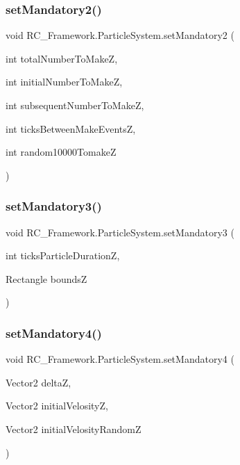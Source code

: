 \subsubsection{\texorpdfstring{set\+Mandatory2()}{setMandatory2()}}
{\footnotesize\ttfamily void R\+C\+\_\+\+Framework.\+Particle\+System.\+set\+Mandatory2 (\begin{DoxyParamCaption}\item[{int}]{total\+Number\+To\+MakeZ,  }\item[{int}]{initial\+Number\+To\+MakeZ,  }\item[{int}]{subsequent\+Number\+To\+MakeZ,  }\item[{int}]{ticks\+Between\+Make\+EventsZ,  }\item[{int}]{random10000\+TomakeZ }\end{DoxyParamCaption})}

\mbox{\label{class_r_c___framework_1_1_particle_system_a4a7d1047a8f891f66c5cc2f290520107}} 
\subsubsection{\texorpdfstring{set\+Mandatory3()}{setMandatory3()}}
{\footnotesize\ttfamily void R\+C\+\_\+\+Framework.\+Particle\+System.\+set\+Mandatory3 (\begin{DoxyParamCaption}\item[{int}]{ticks\+Particle\+DurationZ,  }\item[{Rectangle}]{boundsZ }\end{DoxyParamCaption})}

\mbox{\label{class_r_c___framework_1_1_particle_system_a7b3f6b8c93d32699592cb3737f449fa9}} 
\subsubsection{\texorpdfstring{set\+Mandatory4()}{setMandatory4()}}
{\footnotesize\ttfamily void R\+C\+\_\+\+Framework.\+Particle\+System.\+set\+Mandatory4 (\begin{DoxyParamCaption}\item[{Vector2}]{deltaZ,  }\item[{Vector2}]{initial\+VelosityZ,  }\item[{Vector2}]{initial\+Velosity\+RandomZ }\end{DoxyParamCaption})}

